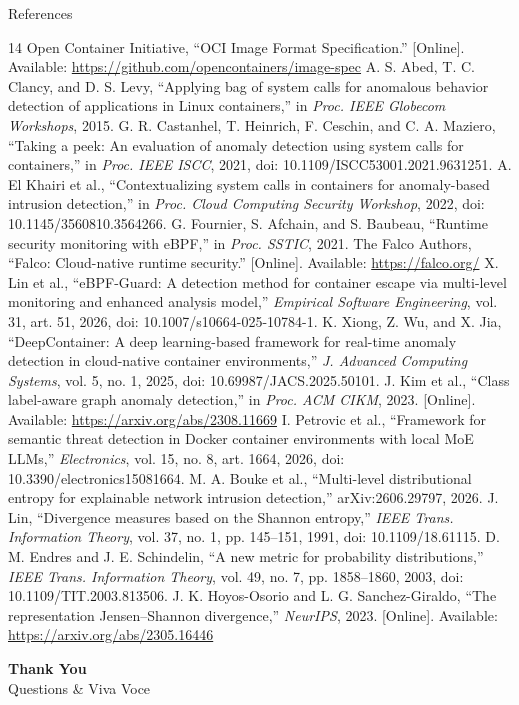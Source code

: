 \documentclass[aspectratio=169,10pt]{beamer}
\begin{document}
\begin{frame}[allowframebreaks]{References}
\footnotesize
\begin{thebibliography}{14}
 Open Container Initiative, ``OCI Image Format Specification.'' [Online]. Available: \url{https://github.com/opencontainers/image-spec}
 A. S. Abed, T. C. Clancy, and D. S. Levy, ``Applying bag of system calls for anomalous behavior detection of applications in Linux containers,'' in \textit{Proc. IEEE Globecom Workshops}, 2015.
 G. R. Castanhel, T. Heinrich, F. Ceschin, and C. A. Maziero, ``Taking a peek: An evaluation of anomaly detection using system calls for containers,'' in \textit{Proc. IEEE ISCC}, 2021, doi: 10.1109/ISCC53001.2021.9631251.
 A. El Khairi et al., ``Contextualizing system calls in containers for anomaly-based intrusion detection,'' in \textit{Proc. Cloud Computing Security Workshop}, 2022, doi: 10.1145/3560810.3564266.
 G. Fournier, S. Afchain, and S. Baubeau, ``Runtime security monitoring with eBPF,'' in \textit{Proc. SSTIC}, 2021.
 The Falco Authors, ``Falco: Cloud-native runtime security.'' [Online]. Available: \url{https://falco.org/}
 X. Lin et al., ``eBPF-Guard: A detection method for container escape via multi-level monitoring and enhanced analysis model,'' \textit{Empirical Software Engineering}, vol. 31, art. 51, 2026, doi: 10.1007/s10664-025-10784-1.
 K. Xiong, Z. Wu, and X. Jia, ``DeepContainer: A deep learning-based framework for real-time anomaly detection in cloud-native container environments,'' \textit{J. Advanced Computing Systems}, vol. 5, no. 1, 2025, doi: 10.69987/JACS.2025.50101.
 J. Kim et al., ``Class label-aware graph anomaly detection,'' in \textit{Proc. ACM CIKM}, 2023. [Online]. Available: \url{https://arxiv.org/abs/2308.11669}
 I. Petrovic et al., ``Framework for semantic threat detection in Docker container environments with local MoE LLMs,'' \textit{Electronics}, vol. 15, no. 8, art. 1664, 2026, doi: 10.3390/electronics15081664.
 M. A. Bouke et al., ``Multi-level distributional entropy for explainable network intrusion detection,'' arXiv:2606.29797, 2026.
 J. Lin, ``Divergence measures based on the Shannon entropy,'' \textit{IEEE Trans. Information Theory}, vol. 37, no. 1, pp. 145--151, 1991, doi: 10.1109/18.61115.
 D. M. Endres and J. E. Schindelin, ``A new metric for probability distributions,'' \textit{IEEE Trans. Information Theory}, vol. 49, no. 7, pp. 1858--1860, 2003, doi: 10.1109/TIT.2003.813506.
 J. K. Hoyos-Osorio and L. G. Sanchez-Giraldo, ``The representation Jensen--Shannon divergence,'' \textit{NeurIPS}, 2023. [Online]. Available: \url{https://arxiv.org/abs/2305.16446}
\end{thebibliography}
\end{frame}

\begin{frame}[plain]\centering\vfill
{\Huge\bfseries\color{amritaMaroon}Thank You}\\[0.35cm]
{\Large Questions \& Viva Voce}\vfill
\end{frame}
\end{document}
